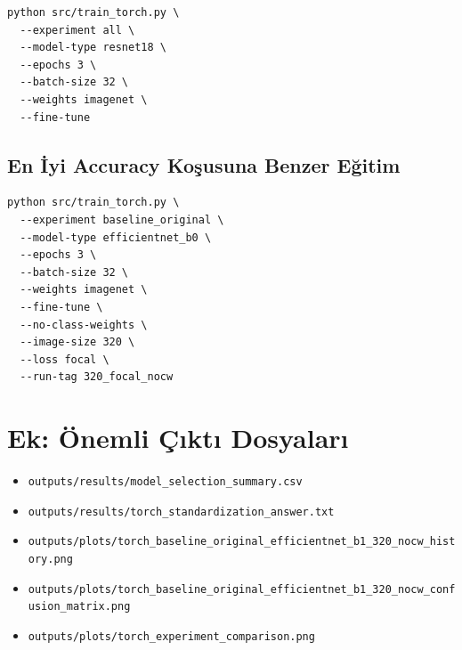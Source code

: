\documentclass[12pt,a4paper]{article}
\begin{document}
\begin{verbatim}
python src/train_torch.py \
  --experiment all \
  --model-type resnet18 \
  --epochs 3 \
  --batch-size 32 \
  --weights imagenet \
  --fine-tune
\end{verbatim}

\subsection{En İyi Accuracy Koşusuna Benzer Eğitim}

\begin{verbatim}
python src/train_torch.py \
  --experiment baseline_original \
  --model-type efficientnet_b0 \
  --epochs 3 \
  --batch-size 32 \
  --weights imagenet \
  --fine-tune \
  --no-class-weights \
  --image-size 320 \
  --loss focal \
  --run-tag 320_focal_nocw
\end{verbatim}

\section{Ek: Önemli Çıktı Dosyaları}

\begin{itemize}
    \item \texttt{outputs/results/model\_selection\_summary.csv}
    \item \texttt{outputs/results/torch\_standardization\_answer.txt}
    \item \texttt{outputs/plots/torch\_baseline\_original\_efficientnet\_b1\_320\_nocw\_history.png}
    \item \texttt{outputs/plots/torch\_baseline\_original\_efficientnet\_b1\_320\_nocw\_confusion\_matrix.png}
    \item \texttt{outputs/plots/torch\_experiment\_comparison.png}
\end{itemize}
\end{document}
